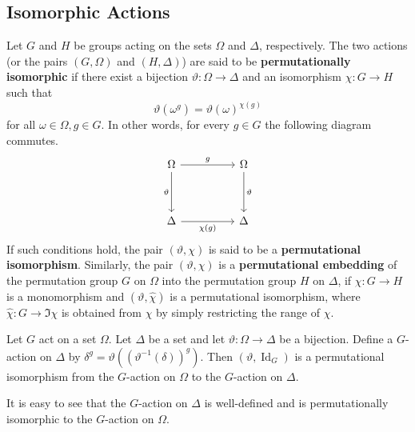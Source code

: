 \subsection{Isomorphic Actions}
\begin{definition}
	Let $G$ and $H$ be groups acting on the sets $\Omega$ and $\Delta$, respectively. The two actions (or the pairs $(G,\Omega)$ and $(H,\Delta)$) are said to be \textbf{permutationally isomorphic} if there exist a bijection $\vartheta: \Omega \to \Delta$ and an isomorphism $\chi: G \to H$ such that
	\[ \vartheta(\omega^g) = \vartheta(\omega)^{\chi(g)} \]
	for all  $\omega \in \Omega, g \in G$. In other words, for every $g\in G$ the following diagram commutes.
	\[\begin{tikzcd}
		\Omega && \Omega \\
		\\
		\Delta && \Delta
		\arrow["g", from=1-1, to=1-3]
		\arrow["\vartheta"', from=1-1, to=3-1]
		\arrow["\vartheta", from=1-3, to=3-3]
		\arrow["{\chi(g)}"', from=3-1, to=3-3]
	\end{tikzcd}\]
	If such conditions hold, the pair $(\vartheta, \chi)$ is said to be a \textbf{permutational isomorphism}. Similarly, the pair $(\vartheta, \chi)$ is a \textbf{permutational embedding} of the permutation group $G$ on $\Omega$ into the permutation group $H$ on $\Delta$, if $\chi: G \to H$ is a monomorphism and $(\vartheta, \hat{\chi})$ is a permutational isomorphism, where $\hat{\chi}: G \to \Im \chi$ is obtained from $\chi$ by simply restricting the range of $\chi$.
\end{definition}


\begin{proposition}
	Let $G$ act on a set $\Omega$. Let $\Delta$ be a set and let $\vartheta: \Omega \to \Delta$ be a bijection. Define a $G$-action on $\Delta$ by $\delta^g = \vartheta((\vartheta^{-1}(\delta))^g)$. Then $(\vartheta, \operatorname{Id}_G)$ is a permutational isomorphism from the $G$-action on $\Omega$ to the $G$-action on $\Delta$.
\end{proposition}

\begin{sketch}
	It is easy to see that the $G$-action on $\Delta$ is well-defined and is permutationally isomorphic to the $G$-action on $\Omega$. 
\end{sketch}


